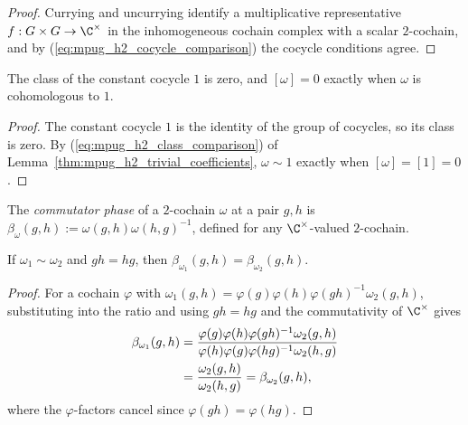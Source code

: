 \begin{proof}\leanok
    Currying and uncurrying identify a multiplicative representative
    $f:G\times G\to\C^\times$ in the inhomogeneous cochain complex with a
    scalar $2$-cochain, and by (\ref{eq:mpug_h2_cocycle_comparison}) the
    cocycle conditions agree.
\end{proof}

\begin{lemma}\label{thm:trivial_class}
    \leanok
    The class of the constant cocycle $1$ is zero, and $[\omega]=0$ exactly
    when $\omega$ is cohomologous to $1$.
\end{lemma}

\begin{proof}\leanok
    The constant cocycle $1$ is the identity of the group of cocycles, so its
    class is zero. By (\ref{eq:mpug_h2_class_comparison}) of
    Lemma~\ref{thm:mpug_h2_trivial_coefficients}, $\omega\sim1$ exactly
    when $[\omega]=[1]=0$.
\end{proof}

\begin{definition}\label{def:comm_phase}
    \leanok
    The \emph{commutator phase} of a $2$-cochain $\omega$ at a pair $g,h$ is
    $\beta_\omega(g,h):=\omega(g,h) \omega(h,g)^{-1}$, defined for any
    $\C^{\times}$-valued $2$-cochain.
\end{definition}

\begin{lemma}\label{thm:comm_phase_invariant}
    \leanok
    If $\omega_1\sim\omega_2$ and $gh=hg$, then
    $\beta_{\omega_1}(g,h)=\beta_{\omega_2}(g,h)$.
\end{lemma}

\begin{proof}\leanok{}
    For a cochain $\varphi$ with
    $\omega_1(g,h)=\varphi(g)\varphi(h)\varphi(gh)^{-1}\omega_2(g,h)$,
    substituting into the ratio and using
    $gh=hg$ and the commutativity of $\C^{\times}$ gives
    \begin{align}
        \beta_{\omega_1}(g,h)
         & =
        \frac{\varphi(g)\varphi(h)\varphi(gh)^{-1} \omega_2(g,h)}
        {\varphi(h)\varphi(g)\varphi(hg)^{-1} \omega_2(h,g)}
        \notag                                  \\
         & =\frac{\omega_2(g,h)}{\omega_2(h,g)}
        =\beta_{\omega_2}(g,h),
        \label{eq:symmetry_comm_phase_invariance}
    \end{align}
    where the $\varphi$-factors cancel since
    $\varphi(gh)=\varphi(hg)$.
\end{proof}

